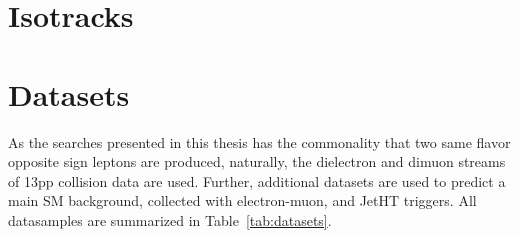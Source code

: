 \section{\ptmiss}
\section{Isotracks}
\section{Datasets}
\label{sec:samplesObjects}
As the searches presented in this thesis has the commonality that two same flavor opposite sign leptons are produced, naturally, the dielectron and dimuon streams of 13\TeV pp collision data are used.
Further, additional datasets are used to predict a main SM background, collected with electron-muon, \ptmiss and JetHT triggers. 
All datasamples are summarized in Table~\ref{tab:datasets}.  
